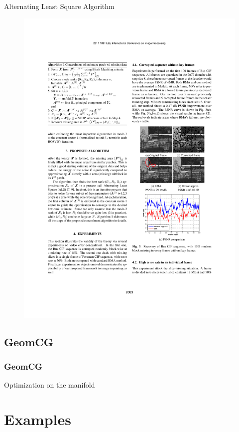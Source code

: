 \documentclass{beamer}
\begin{document}
\begin{frame}[fragile] %
\begin{block}{Alternating Least Square Algorithm}
\begin{figure}
\includegraphics[width=0.7\linewidth]{AlgoALS}
\end{figure}
\end{block}
\end{frame}

\subsection{GeomCG}

\begin{frame}
\frametitle{GeomCG}
Optimization on the manifold
\end{frame}


\section{Examples}
\end{document}
